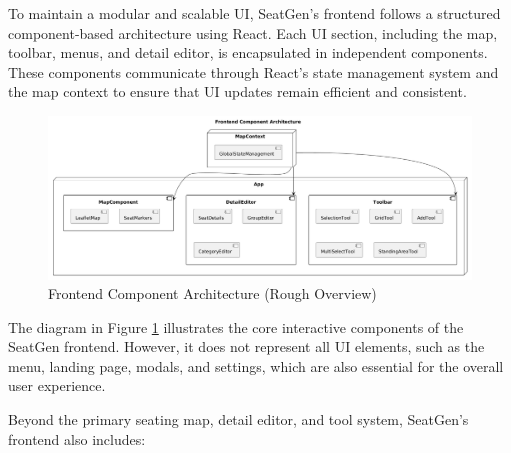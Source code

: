 To maintain a modular and scalable UI, SeatGen’s frontend follows a structured component-based architecture using React. Each UI section, including the map, toolbar, menus, and detail editor, is encapsulated in independent components. These components communicate through React’s state management system and the map context to ensure that UI updates remain efficient and consistent.

\begin{figure}[H]
    \begin{center}
        \includegraphics[scale=0.3]{pics/frontend_architecture.png}
    \end{center}
    \caption{Frontend Component Architecture (Rough Overview)}
    \label{fig:frontend-architecture}
\end{figure}

The diagram in Figure \ref{fig:frontend-architecture} illustrates the core interactive components of the SeatGen frontend. However, it does not represent all UI elements, such as the menu, landing page, modals, and settings, which are also essential for the overall user experience.

Beyond the primary seating map, detail editor, and tool system, SeatGen's frontend also includes:

